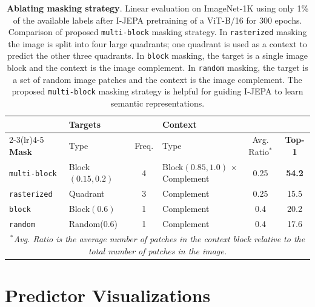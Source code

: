 \documentclass[10pt,twocolumn,letterpaper]{article}
\newcommand{\cc}{\cellcolor{fbApp}}
\newcommand{\putalg}{{I-JEPA}\xspace}
\begin{document}
\begin{table}[h]
    \centering
    \begin{tabular}{l l c l c c}
        & \multicolumn{2}{l}{\bf\small Targets} & \multicolumn{2}{l}{\bf\small Context} \\ \cmidrule(lr){2-3}\cmidrule(lr){4-5}
        \bf\small Mask & \small Type & \small Freq. & \small Type & \small Avg. Ratio$^*$ & \bf\small Top-1 \\
        \toprule
        \cc\tt multi-block & \cc\small Block$(0.15, 0.2)$ & \cc\small 4 & \cc\small Block$(0.85,1.0)$ $\times$ Complement & \cc 0.25 & \cc\bf 54.2 \\
        \small\tt rasterized & \small Quadrant & \small 3 & \small Complement & 0.25 & 15.5 \\
        \small\tt block & \small Block$(0.6)$ & \small 1 & \small Complement & 0.4 & 20.2 \\
        \small\tt random & \small Random(0.6) & \small 1 & \small Complement & 0.4 & 17.6 \\
        \bottomrule
        \multicolumn{6}{c}{\footnotesize \it $^*$Avg. Ratio is the average number of patches in the context block relative to the total number of patches in the image.}
    \end{tabular}
    \caption{\textbf{Ablating masking strategy}.
    Linear evaluation on ImageNet-1K using only 1\% of the available labels
    after \putalg pretraining of a ViT-B/16 for 300 epochs. 
    Comparison of proposed {\tt multi-block} masking strategy. In {\tt rasterized} masking the image is split into four large quadrants; one quadrant is used as a context to predict the other three quadrants.
    In {\tt block} masking, the target is a single image block and the context is the image complement.
    In {\tt random} masking, the target is a set of random image patches and the context is the image complement.
    The proposed {\tt multi-block} masking strategy is helpful for guiding I-JEPA to learn semantic representations.}
    \label{tb:ablation-masking}
\end{table}


\section{Predictor Visualizations}
\label{sec:predictor}
\end{document}
